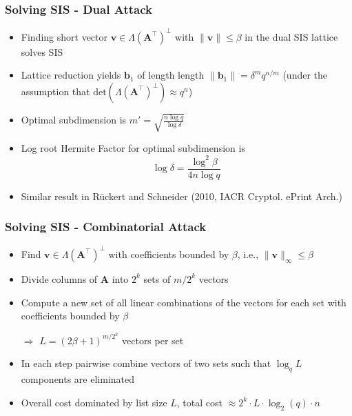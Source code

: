 \documentclass[t, aspectratio=169]{beamer}
\begin{document}
\begin{frame}
    \frametitle{Solving SIS - Dual Attack}%
    \begin{itemize}[<+->]
        \item Finding short vector $\mathbf{v} \in \Lambda(\mathbf{A}^\intercal)^{\perp}$ with $\|\mathbf{v}\| \leq \beta$ in the dual SIS lattice solves SIS
        \item Lattice reduction yields $\mathbf{b}_1$ of length length $\|\mathbf{b}_1\| = \delta^m q^{n/m}$ (under the assumption that $\text{det}(\Lambda(\mathbf{A}^\intercal)^{\perp})\approx q^n$) %
        \item Optimal subdimension is $m' = \sqrt{\frac{n \log q}{\log \delta}}$ %
        \item Log root Hermite Factor for optimal subdimension is
              \begin{equation*}
                  \log \delta = \frac{\log^2 \beta}{4n \log q}
              \end{equation*}
        \item Similar result in Rückert and Schneider (2010, IACR Cryptol. ePrint Arch.)
    \end{itemize}
\end{frame}
\begin{frame}
    \frametitle{Solving SIS - Combinatorial Attack}%
    \begin{itemize}[<+->]
        \item Find $\mathbf{v} \in \Lambda(\mathbf{A}^\intercal)^{\perp}$ with coefficients bounded by $\beta$, i.e., $\|\mathbf{v}\|_\infty \leq \beta$
        \item Divide columns of $\mathbf{A}$ into $2^k$ sets of $m/2^k$ vectors
        \item Compute a new set of all linear combinations of the vectors for each set with coefficients bounded by $\beta$
        \item[$\Rightarrow$] $L=(2\beta+1)^{m/2^k}$ vectors per set
        \item In each step pairwise combine vectors of two sets such that $\log_q L$ components are eliminated
        \item Overall cost dominated by list size $L$, total cost $\approx 2^k \cdot L \cdot \log_2(q) \cdot n$ %
    \end{itemize}
\end{frame}
\end{document}

